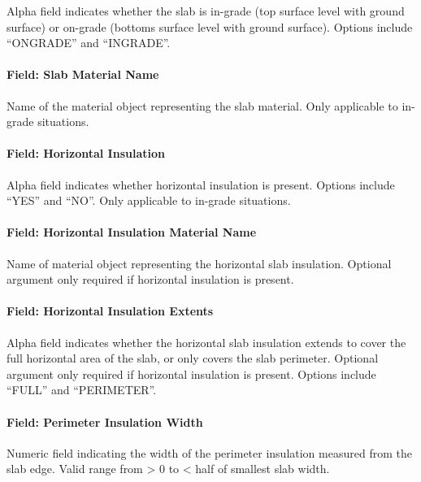 Alpha field indicates whether the slab is in-grade (top surface level with ground surface) or on-grade (bottoms surface level with ground surface). Options include ``ONGRADE'' and ``INGRADE''.

\paragraph{Field: Slab Material Name}\label{field-slab-material-name}

Name of the material object representing the slab material. Only applicable to in-grade situations.

\paragraph{Field: Horizontal Insulation}\label{field-horizontal-insulation}

Alpha field indicates whether horizontal insulation is present. Options include ``YES'' and ``NO''. Only applicable to in-grade situations.

\paragraph{Field: Horizontal Insulation Material Name}\label{field-horizontal-insulation-material-name}

Name of material object representing the horizontal slab insulation. Optional argument only required if horizontal insulation is present.

\paragraph{Field: Horizontal Insulation Extents}\label{field-horizontal-insulation-extents}

Alpha field indicates whether the horizontal slab insulation extends to cover the full horizontal area of the slab, or only covers the slab perimeter. Optional argument only required if horizontal insulation is present. Options include ``FULL'' and ``PERIMETER''.

\paragraph{Field: Perimeter Insulation Width}\label{field-perimeter-insulation-width}

Numeric field indicating the width of the perimeter insulation measured from the slab edge. Valid range from \textgreater{} 0 to \textless{} half of smallest slab width.

